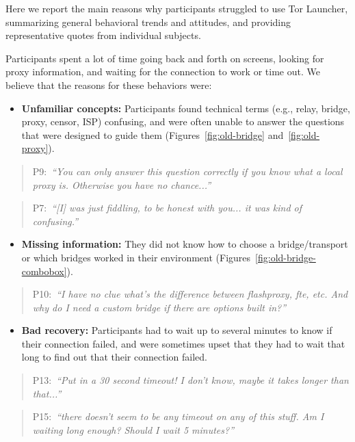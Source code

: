 \documentclass[USenglish,oneside,twocolumn]{article}
\newcommand{\pquote}[2]{
\begin{quotation}
\noindent #1:~\textit{#2}
\end{quotation}
}
\begin{document}
Here we report the main reasons why participants struggled to use Tor Launcher, summarizing general behavioral trends and attitudes, and providing representative quotes from individual subjects.

Participants spent a lot of time going back and forth on screens, looking for proxy information, and waiting for the connection to work or time out. We believe that the reasons for these behaviors were:\\

\begin{itemize}
\item {\bfseries Unfamiliar concepts:} Participants found technical terms (e.g., relay, bridge, proxy, censor, ISP) confusing, and were often unable to answer the questions that were designed to guide them (Figures~\ref{fig:old-bridge} and~\ref{fig:old-proxy}).
\end{itemize} 

\pquote{P9}{``You can only answer this question correctly if you know what a local proxy is.
Otherwise you have no chance...''}

\pquote{P7}{``[I] was just fiddling, to be honest with you... it was kind of confusing.''}

\begin{itemize}
\item {\bfseries Missing information:} They did not know how to choose a bridge/transport or which bridges worked in their environment (Figures~\ref{fig:old-bridge-combobox}).
\end{itemize} 

\pquote{P10}{``I have no clue what's the difference between flashproxy, fte, etc. And why do I need a custom bridge if there are options built in?''}

\begin{itemize}
\item {\bfseries Bad recovery:} Participants had to wait up to several minutes to know if their connection failed, and were sometimes upset that they had to wait that long to find out that their connection failed.
\end{itemize} 

\pquote{P13}{``Put in a 30 second timeout! I don't know, maybe it takes longer than that...''}

\pquote{P15}{``there doesn't seem to be any timeout on any of this stuff. Am I waiting long enough? Should I wait 5 minutes?''}
\end{document}
